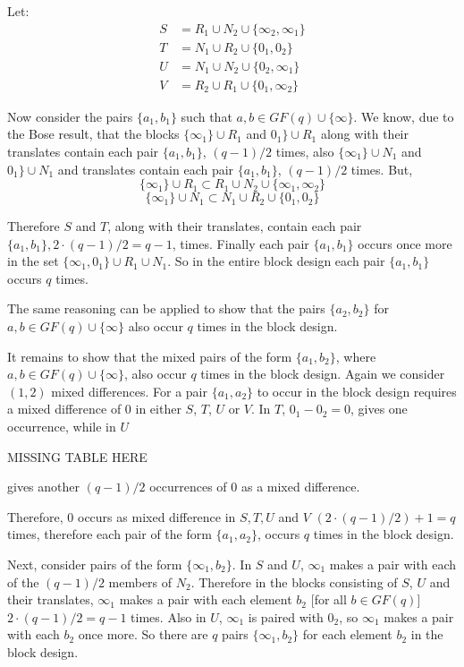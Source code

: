 \documentclass[
  11pt,
  a4paper]{book}
\begin{document}
Let:
\begin{align}
  S &= R_1 \cup N_2 \cup \{\infty _2, \infty _1\} \\
  T &= N_1 \cup R_2 \cup \{0_1, 0_2\} \\
  U &= N_1 \cup N_2 \cup \{0 _2, \infty _1\} \\
  V &= R_2 \cup R_1 \cup \{0_1, \infty _2\}
\end{align}

Now consider the pairs \(\{a_1,b_1\}\) such that
\(a,b \in GF(q) \cup \{\infty\}\). We know, due to the Bose
result, that the blocks
\(\{\infty _1\} \cup R_1\) and \(0 _1\} \cup R_1\)
along with their translates contain each pair
\(\{a_1, b_1\}\), \((q - 1)/2\) times, also
\(\{\infty _1\} \cup N_1\) and
\(0 _1\} \cup N_1\)
and translates contain each pair
\(\{a_1,b_1\}\), \((q-1)/2\) times. But,
\[\{\infty _1\} \cup R_1 \subset R_1 \cup N_2 \cup \{\infty _1, \infty _2\}\]
\[\{\infty _1\} \cup N_1 \subset N_1 \cup R_2 \cup \{0_1, 0_2\}\]

Therefore \(S\) and \(T\), along with their translates, contain
each pair \(\{a_1, b_1\}, 2\cdot (q - 1)/2 = q - 1\), times.
Finally each pair \(\{a_1, b_1\}\) occurs once more in the set
\(\{\infty _1, 0_1\} \cup R_1 \cup N_1\). So in the entire
block design each pair \(\{a_1, b_1\}\) occurs \(q\) times.

The same reasoning can be applied to show that the pairs
\(\{a_2,b_2\}\) for \(a,b \in GF(q) \cup \{\infty\}\) also occur
\(q\) times in the block design.

It remains to show that the mixed pairs of the form
\(\{a_1, b_2\}\), where \(a, b \in GF(q) \cup \{\infty\}\), also
occur \(q\) times in the block design. Again we consider \((1, 2)\)
mixed differences. For a pair \(\{a_1, a_2\}\) to occur in the
block design requires a mixed difference of 0 in either \(S\),
\(T\), \(U\) or \(V\). In \(T\), \(0_1 - 0_2 = 0\), gives one
occurrence, while in \(U\)

MISSING TABLE HERE

gives another \((q - 1)/2\) occurrences of 0 as a mixed
difference.

Therefore, 0 occurs as mixed difference in \(S, T, U\) and \(V\)
\((2\cdot (q - 1)/2) + 1 = q\) times, therefore each pair of the
form \(\{a_1, a_2\}\), occurs \(q\) times in the block design.

Next, consider pairs of the form \(\{\infty _1, b_2\}\). In
\(S\) and \(U\), \(\infty _1\) makes a pair with each of the
\((q - 1)/2\) members of \(N_2\). Therefore in the blocks
consisting of \(S\), \(U\) and their translates, \(\infty _1\)
makes a pair with each element \(b_2\) {[}for all \(b \in GF(q)\){]}
\(2 \cdot (q - 1)/2 = q - 1\) times. Also in \(U\), \(\infty _1\) is
paired with \(0_2\), so \(\infty _1\) makes a pair with each
\(b_2\) once more. So there are \(q\) pairs \(\{\infty _1, b_2\}\)
for each element \(b_2\) in the block design.
\end{document}

